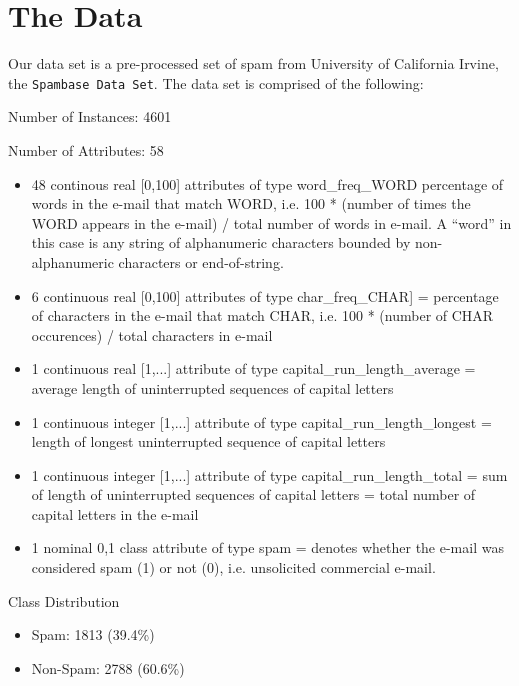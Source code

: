 \documentclass{article} %
\begin{document}
\section{The Data}
Our data set is a pre-processed set of spam from University of California Irvine,
the \texttt{Spambase Data Set}.\cite{spambase} The data set is comprised of the
following:
\begin{description}
  \item Number of Instances: 4601
  \item Number of Attributes: 58
  \begin{itemize}
    \item 48 continous real [0,100] attributes of type word\_freq\_WORD
    percentage of words in the e-mail that match WORD, i.e. 100 * (number of
    times the WORD appears in the e-mail) / total number of words in e-mail. A
    ``word'' in this case is any string of alphanumeric characters bounded by
    non-alphanumeric characters or end-of-string.

    \item 6 continuous real [0,100] attributes of type char\_freq\_CHAR]
    = percentage of characters in the e-mail that match CHAR, i.e. 100 *
    (number of CHAR occurences) / total characters in e-mail

    \item 1 continuous real [1,...] attribute of type capital\_run\_length\_average
    = average length of uninterrupted sequences of capital letters

    \item 1 continuous integer [1,...] attribute of type capital\_run\_length\_longest
    = length of longest uninterrupted sequence of capital letters

    \item 1 continuous integer [1,...] attribute of type capital\_run\_length\_total
    = sum of length of uninterrupted sequences of capital letters
    = total number of capital letters in the e-mail

    \item 1 nominal {0,1} class attribute of type spam
    = denotes whether the e-mail was considered spam (1) or not (0), i.e.
    unsolicited commercial e-mail.
  \end{itemize}
  \item Class Distribution
  \begin{itemize}
      \item Spam: 1813 (39.4\%)
      \item Non-Spam: 2788 (60.6\%)
  \end{itemize}
\end{description}
\end{document}
